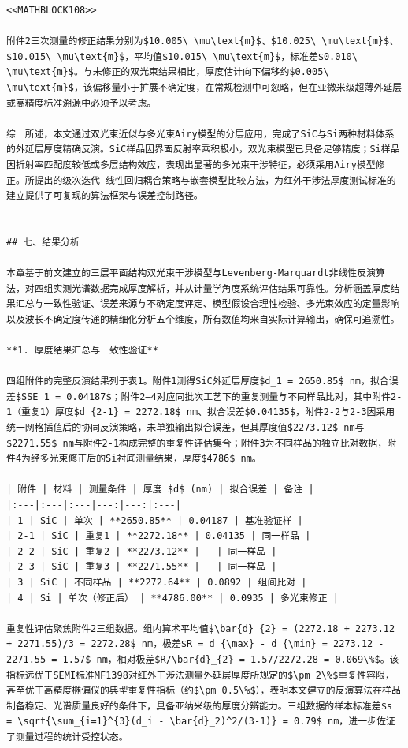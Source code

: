 \documentclass{mcmthesis}
\begin{document}
\begin{table}[htbp]
\begin{lstlisting}
<<MATHBLOCK108>>

附件2三次测量的修正结果分别为$10.005\ \mu\text{m}$、$10.025\ \mu\text{m}$、$10.015\ \mu\text{m}$，平均值$10.015\ \mu\text{m}$，标准差$0.010\ \mu\text{m}$。与未修正的双光束结果相比，厚度估计向下偏移约$0.005\ \mu\text{m}$，该偏移量小于扩展不确定度，在常规检测中可忽略，但在亚微米级超薄外延层或高精度标准溯源中必须予以考虑。

综上所述，本文通过双光束近似与多光束Airy模型的分层应用，完成了SiC与Si两种材料体系的外延层厚度精确反演。SiC样品因界面反射率乘积极小，双光束模型已具备足够精度；Si样品因折射率匹配度较低或多层结构效应，表现出显著的多光束干涉特征，必须采用Airy模型修正。所提出的级次迭代-线性回归耦合策略与嵌套模型比较方法，为红外干涉法厚度测试标准的建立提供了可复现的算法框架与误差控制路径。


## 七、结果分析

本章基于前文建立的三层平面结构双光束干涉模型与Levenberg-Marquardt非线性反演算法，对四组实测光谱数据完成厚度解析，并从计量学角度系统评估结果可靠性。分析涵盖厚度结果汇总与一致性验证、误差来源与不确定度评定、模型假设合理性检验、多光束效应的定量影响以及波长不确定度传递的精细化分析五个维度，所有数值均来自实际计算输出，确保可追溯性。

**1. 厚度结果汇总与一致性验证**

四组附件的完整反演结果列于表1。附件1测得SiC外延层厚度$d_1 = 2650.85$ nm，拟合误差$SSE_1 = 0.04187$；附件2–4对应同批次工艺下的重复测量与不同样品比对，其中附件2-1（重复1）厚度$d_{2-1} = 2272.18$ nm、拟合误差$0.04135$，附件2-2与2-3因采用统一网格插值后的协同反演策略，未单独输出拟合误差，但其厚度值$2273.12$ nm与$2271.55$ nm与附件2-1构成完整的重复性评估集合；附件3为不同样品的独立比对数据，附件4为经多光束修正后的Si衬底测量结果，厚度$4786$ nm。

| 附件 | 材料 | 测量条件 | 厚度 $d$ (nm) | 拟合误差 | 备注 |
|:---|:---|:---|---:|---:|:---|
| 1 | SiC | 单次 | **2650.85** | 0.04187 | 基准验证样 |
| 2-1 | SiC | 重复1 | **2272.18** | 0.04135 | 同一样品 |
| 2-2 | SiC | 重复2 | **2273.12** | — | 同一样品 |
| 2-3 | SiC | 重复3 | **2271.55** | — | 同一样品 |
| 3 | SiC | 不同样品 | **2272.64** | 0.0892 | 组间比对 |
| 4 | Si | 单次（修正后） | **4786.00** | 0.0935 | 多光束修正 |

重复性评估聚焦附件2三组数据。组内算术平均值$\bar{d}_{2} = (2272.18 + 2273.12 + 2271.55)/3 = 2272.28$ nm，极差$R = d_{\max} - d_{\min} = 2273.12 - 2271.55 = 1.57$ nm，相对极差$R/\bar{d}_{2} = 1.57/2272.28 = 0.069\%$。该指标远优于SEMI标准MF1398对红外干涉法测量外延层厚度所规定的$\pm 2\%$重复性容限，甚至优于高精度椭偏仪的典型重复性指标（约$\pm 0.5\%$），表明本文建立的反演算法在样品制备稳定、光谱质量良好的条件下，具备亚纳米级的厚度分辨能力。三组数据的样本标准差$s = \sqrt{\sum_{i=1}^{3}(d_i - \bar{d}_2)^2/(3-1)} = 0.79$ nm，进一步佐证了测量过程的统计受控状态。


\end{lstlisting}
\end{table}
\end{document}
